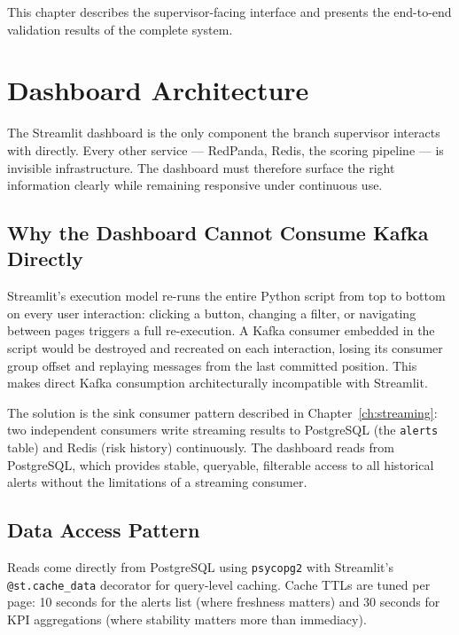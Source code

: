 This chapter describes the supervisor-facing interface and presents the
end-to-end validation results of the complete system.

\section{Dashboard Architecture}
\label{sec:dashboard-arch}

The Streamlit dashboard is the only component the branch supervisor
interacts with directly. Every other service --- RedPanda, Redis, the
scoring pipeline --- is invisible infrastructure. The dashboard must
therefore surface the right information clearly while remaining responsive
under continuous use.

\subsection{Why the Dashboard Cannot Consume Kafka Directly}

Streamlit's execution model re-runs the entire Python script from top to
bottom on every user interaction: clicking a button, changing a filter, or
navigating between pages triggers a full re-execution. A Kafka consumer
embedded in the script would be destroyed and recreated on each interaction,
losing its consumer group offset and replaying messages from the last
committed position. This makes direct Kafka consumption architecturally
incompatible with Streamlit.

The solution is the sink consumer pattern described in
Chapter~\ref{ch:streaming}: two independent consumers write streaming
results to PostgreSQL (the \texttt{alerts} table) and Redis (risk history)
continuously. The dashboard reads from PostgreSQL, which provides stable,
queryable, filterable access to all historical alerts without the
limitations of a streaming consumer.

\subsection{Data Access Pattern}

Reads come directly from PostgreSQL using \texttt{psycopg2} with
Streamlit's \texttt{@st.cache\_data} decorator for query-level caching.
Cache TTLs are tuned per page: 10 seconds for the alerts list (where
freshness matters) and 30 seconds for KPI aggregations (where stability
matters more than immediacy).

